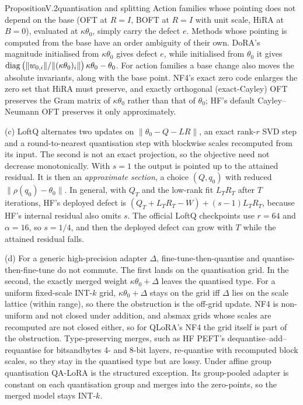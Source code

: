 \begin{restate}{Proposition}{V.2}{quantisation and splitting}
Action families whose pointing does not depend on the base (OFT at $R=I$, BOFT at $R=I$ with unit scale, HiRA at $B=0$),
evaluated at $\kappa\theta_0$, simply carry the defect $e$. Methods whose pointing is computed from the base have an order
ambiguity of their own. DoRA's magnitude initialised from $\kappa\theta_0$ gives defect $e$, while initialised from
$\theta_0$ it gives $\operatorname{diag}\big(\lVert w_{0,i}\rVert/\lVert(\kappa\theta_0)_i\rVert\big)\,\kappa\theta_0-\theta_0$. For
action families a base change also moves the absolute invariants, along with the base point. NF4's exact zero code
enlarges the zero set that HiRA must preserve, and exactly orthogonal (exact-Cayley) OFT preserves the Gram matrix of
$\kappa\theta_0$ rather than that of $\theta_0$; HF's default Cayley--Neumann OFT preserves it only approximately.

(c) LoftQ alternates two updates on $\lVert\theta_0-Q-LR\rVert$, an exact rank-$r$ SVD step and a round-to-nearest
quantisation step with blockwise scales recomputed from its input. The second is not an exact projection, so the
objective need not decrease monotonically. With $s=1$ the output is pointed up to the attained residual. It is then an
\emph{approximate section}, a choice $(Q,q_0)$ with reduced $\lVert\rho(q_0)-\theta_0\rVert$. In general, with $Q_T$ and
the low-rank fit $L_TR_T$ after $T$ iterations, HF's deployed defect is $(Q_T+L_TR_T-W)+(s-1)L_TR_T$, because HF's internal
residual also omits $s$. The official LoftQ checkpoints use $r=64$ and $\alpha=16$, so $s=1/4$, and then the deployed
defect can grow with $T$ while the attained residual falls.

(d) For a generic high-precision adapter $\Delta$, fine-tune-then-quantise and quantise-then-fine-tune do not commute. The
first lands on the quantisation grid. In the second, the exactly merged weight $\kappa\theta_0+\Delta$ leaves the
quantised type. For a uniform fixed-scale INT-$k$ grid, $\kappa\theta_0+\Delta$ stays on the grid iff $\Delta$ lies on
the scale lattice (within range), so there the obstruction is the off-grid update. NF4 is non-uniform and not closed under
addition, and absmax grids whose scales are recomputed are not closed either, so for QLoRA's NF4 the grid itself is part of
the obstruction. Type-preserving merges, such as HF PEFT's dequantise--add--requantise for bitsandbytes 4- and 8-bit
layers, re-quantise with recomputed block scales, so they stay in the quantised type but are lossy. Under affine group
quantisation QA-LoRA is the structured exception. Its group-pooled adapter is constant on each quantisation group and
merges into the zero-points, so the merged model stays INT-$k$.
\end{restate}

